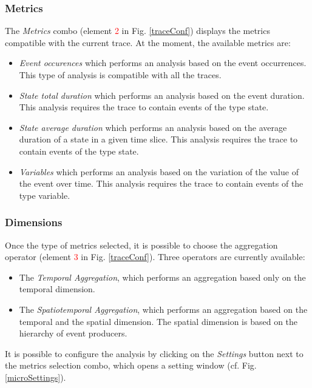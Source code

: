 \documentclass[twoside]{article}
\begin{document}
\begin{sloppypar}
\subsubsection{Metrics}
The \textit{Metrics} combo (element \textcolor{red}{2} in Fig. \ref{traceConf}) displays the metrics compatible with the current trace.
At the moment, the available metrics are: 
\begin{itemize}
	\item \textit{Event occurences} which performs an analysis based on the event occurrences. This type of analysis is compatible with all the traces.
	\item \textit{State total duration} which performs an analysis based on the event duration. This analysis requires the trace to contain events of the type state.
	\item \textit{State average duration} which performs an analysis based on the average duration of a state in a given time slice. This analysis requires the trace to contain events of the type state.
	\item \textit{Variables} which performs an analysis based on the variation of the value of the event over time. This analysis requires the trace to contain events of the type variable.
\end{itemize}

\subsubsection{Dimensions}
Once the type of metrics selected, it is possible to choose the aggregation operator (element \textcolor{red}{3} in Fig. \ref{traceConf}). Three operators are currently available:
\begin{itemize}
	\item The \textit{Temporal Aggregation}, which performs an aggregation based only on the temporal dimension.
	\item The \textit{Spatiotemporal Aggregation}, which performs an aggregation based on the temporal and the spatial dimension. The spatial dimension is based on the hierarchy of event producers.
\end{itemize}

It is possible to configure the analysis by clicking on the \textit{Settings} button next to the metrics selection combo, which opens a setting window (cf. Fig. \ref{microSettings}).


\end{sloppypar}
\end{document}
